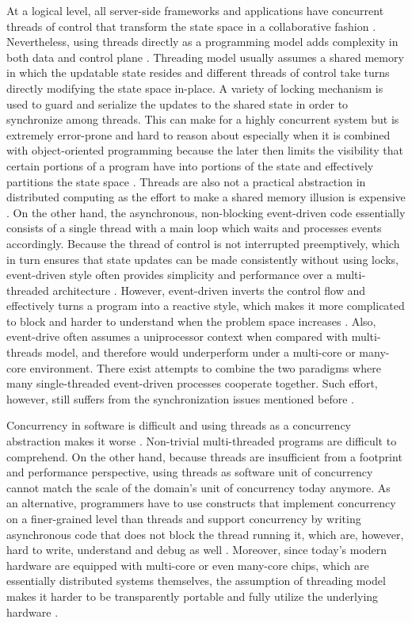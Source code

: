 At a logical level, all server-side frameworks and applications have concurrent threads of control that transform the state space in a collaborative fashion \autocite{UCAM-CL-TR-769}. Nevertheless, using threads directly as a programming model adds complexity in both data and control plane \autocite{UCAM-CL-TR-769}\autocite{Lee:2006:PT:1137232.1137289}. Threading model usually assumes a shared memory in which the updatable state resides and different threads of control take turns directly modifying the state space in-place. A variety of locking mechanism is used to guard and serialize the updates to the shared state in order to synchronize among threads. This can make for a highly concurrent system but is extremely error-prone and hard to reason about especially when it is combined with object-oriented programming because the later then limits the visibility that certain portions of a program have into portions of the state and effectively partitions the state space \autocite{Lee:2006:PT:1137232.1137289}. Threads are also not a practical abstraction in distributed computing as the effort to make a shared memory illusion is expensive \autocite{Lee:2006:PT:1137232.1137289}. On the other hand, the asynchronous, non-blocking event-driven code essentially consists of a single thread with a main loop which waits and processes events accordingly. Because the thread of control is not interrupted preemptively, which in turn ensures that state updates can be made consistently without using locks, event-driven style often provides simplicity and performance over a multi-threaded architecture \autocite{UCAM-CL-TR-769}. However, event-driven inverts the control flow and effectively turns a program into a reactive style, which makes it more complicated to block and harder to understand when the problem space increases \autocite{von2003events}. Also, event-drive often assumes a uniprocessor context when compared with multi-threads model, and therefore would underperform under a multi-core or many-core environment. There exist attempts to combine the two paradigms where many single-threaded event-driven processes cooperate together. Such effort, however, still suffers from the synchronization issues mentioned before \autocite{von2003events}.

Concurrency in software is difficult and using threads as a concurrency abstraction makes it worse \autocite{Lee:2006:PT:1137232.1137289}. Non-trivial multi-threaded programs are difficult to comprehend. On the other hand, because threads are insufficient from a footprint and performance perspective, using threads as software unit of concurrency cannot match the scale of the domain's unit of concurrency today anymore. As an alternative, programmers have to use constructs that implement concurrency on a finer-grained level than threads and support concurrency by writing asynchronous code that does not block the thread running it, which are, however, hard to write, understand and debug as well \autocite{java-loom}. Moreover, since today's modern hardware are equipped with multi-core or even many-core chips, which are essentially distributed systems themselves, the assumption of threading model makes it harder to be transparently portable and fully utilize the underlying hardware \autocite{UCAM-CL-TR-769}. 

